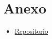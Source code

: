 \documentclass[letterpaper,12pt]{article}
\begin{document}
\section*{Anexo}

\begin{itemize}
  \item \href{https://github.com/lavapatos/cripto-labs/tree/main/lab-3}{Repositorio}
\end{itemize}
\end{document}
